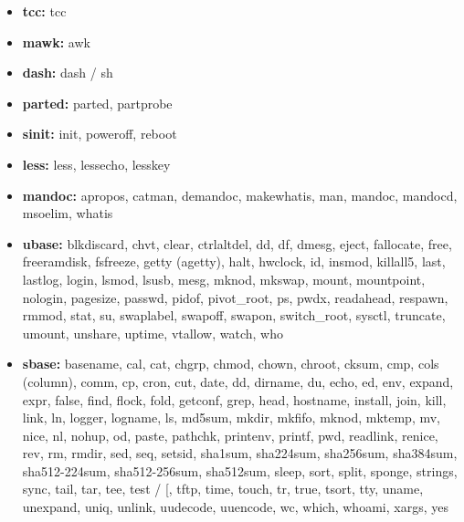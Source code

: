 \begin{itemize}
    \item \textbf{tcc:} tcc
    \item \textbf{mawk:} awk
    \item \textbf{dash:} dash / sh
    \item \textbf{parted:} parted, partprobe
    \item \textbf{sinit:} init, poweroff, reboot
    \item \textbf{less:} less, lessecho, lesskey
    \item \textbf{mandoc:} apropos, catman, demandoc, makewhatis, man, mandoc, mandocd, msoelim, whatis
    \item \textbf{ubase:} blkdiscard, chvt, clear, ctrlaltdel, dd, df, dmesg, eject, fallocate, free, freeramdisk, fsfreeze, getty (agetty), halt, hwclock, id, insmod, killall5, last, lastlog, login, lsmod, lsusb, mesg, mknod, mkswap, mount, mountpoint, nologin, pagesize, passwd, pidof, pivot\_root, ps, pwdx, readahead, respawn, rmmod, stat, su, swaplabel, swapoff, swapon, switch\_root, sysctl, truncate, umount, unshare, uptime, vtallow, watch, who
    \item \textbf{sbase:} basename, cal, cat, chgrp, chmod, chown, chroot, cksum, cmp, cols (column), comm, cp, cron, cut, date, dd, dirname, du, echo, ed, env, expand, expr, false, find, flock, fold, getconf, grep, head, hostname, install, join, kill, link, ln, logger, logname, ls, md5sum, mkdir, mkfifo, mknod, mktemp, mv, nice, nl, nohup, od, paste, pathchk, printenv, printf, pwd, readlink, renice, rev, rm, rmdir, sed, seq, setsid, sha1sum, sha224sum, sha256sum, sha384sum, sha512-224sum, sha512-256sum, sha512sum, sleep, sort, split, sponge, strings, sync, tail, tar, tee, test / [, tftp, time, touch, tr, true, tsort, tty, uname, unexpand, uniq, unlink, uudecode, uuencode, wc, which, whoami, xargs, yes
\end{itemize}
